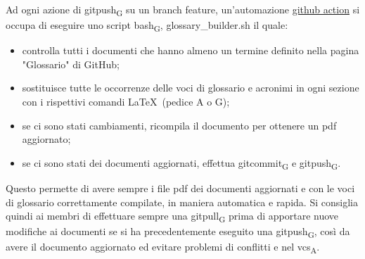     Ad ogni azione di gitpush\textsubscript{G} su un branch feature, un'automazione \href{https://docs.github.com/en/free-pro-team@latest/actions}{github action} si occupa di eseguire uno script bash\textsubscript{G}, glossary\_builder.sh il quale:
    \begin{itemize}
        \item controlla tutti i documenti che hanno almeno un termine definito nella pagina "Glossario" di GitHub;
        \item sostituisce tutte le occorrenze delle voci di glossario e acronimi in ogni sezione con i rispettivi comandi \LaTeX{}\ (pedice A o G);
        \item se ci sono stati cambiamenti, ricompila il documento per ottenere un pdf aggiornato;
        \item se ci sono stati dei documenti aggiornati, effettua gitcommit\textsubscript{G} e gitpush\textsubscript{G}.
    \end{itemize}
    Questo permette di avere sempre i file pdf dei documenti aggiornati e con le voci di glossario correttamente compilate, in maniera automatica e rapida. Si consiglia quindi ai membri di effettuare sempre una gitpull\textsubscript{G} prima di apportare nuove modifiche ai documenti se si ha precedentemente eseguito una gitpush\textsubscript{G}, così da avere il documento aggiornato ed evitare problemi di conflitti e nel vcs\textsubscript{A}.
